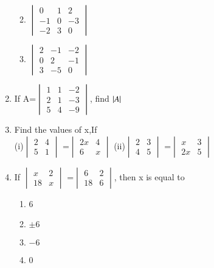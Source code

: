 \begin{enumerate}[label=\arabic*.,ref=\thesubsection.\theenumi]
\begin{enumerate}
\solution 

\item $\begin{vmatrix}
0&1&2 \\ -1&0&-3\\-2&3&0
\end{vmatrix}$
\item $\begin{vmatrix}
2&-1&-2\\0&2&-1\\3&-5&0
\end{vmatrix}$
\end{enumerate}  
\item If A=$\begin{vmatrix}1&1&-2\\2&1&-3\\5&4&-9\end{vmatrix}$, 
find $\left\vert A\right\vert$
\\
\solution 

\item Find the values of x,If\\
(i)$\begin{vmatrix}
2&4\\5&1
\end{vmatrix}$ =$\begin{vmatrix}
2x&4 \\ 6&x
\end{vmatrix}$
(ii)$\begin{vmatrix}
2&3 \\ 4&5
\end{vmatrix}$ =$\begin{vmatrix}
x&3 \\ 2x&5
\end{vmatrix}$
\\
\solution 

\item If  $\begin{vmatrix}
x&2 \\ 18&x
\end{vmatrix}$ =$\begin{vmatrix}
6&2 \\ 18&6
\end{vmatrix}$, then x is equal to 
\begin{enumerate}
\item 6
\item $\pm 6$
\item $-6$
\item 0
\end{enumerate}

\end{enumerate}

